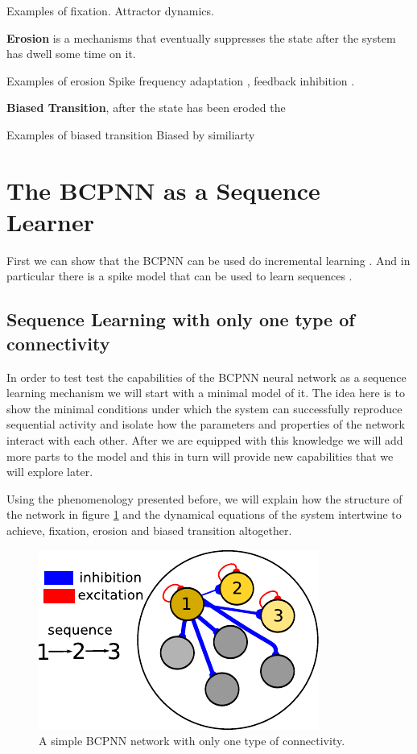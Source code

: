 \documentclass[10pt,a4paper]{article}
\begin{document}
Examples of fixation. Attractor dynamics.

\textbf{Erosion} is a mechanisms that eventually suppresses the state after the system has dwell some time on it. 

Examples of erosion 
Spike frequency adaptation \cite{roach2016memory}, feedback inhibition \cite{recanatesi2017memory}. 

\textbf{Biased Transition}, after the state has been eroded the 

Examples of biased transition
Biased by similiarty \cite{recanatesi2017memory}


\section{The BCPNN as a Sequence Learner}
First we can show that the BCPNN can be used do incremental learning \cite{sandberg2002bayesian}. And in particular there is a spike model that can be used to learn sequences \cite{tully2016spike}. 

\subsection{Sequence Learning with only one type of connectivity}
In order to test test the capabilities of the BCPNN neural network as a sequence learning mechanism we will start with a minimal model of it. The idea here is to show the minimal conditions under which the system can successfully reproduce sequential activity and isolate how the parameters and properties of the network interact with each other. After we are equipped with this knowledge we will add more parts to the model and this in turn will provide new capabilities that we will explore later. 

Using the phenomenology presented before, we will explain how the structure of the network in figure \ref{fig:bcpnn_simple_network} and the dynamical equations of the system intertwine to achieve, fixation, erosion and biased transition altogether. 

\begin{figure}[H]
\centering
\includegraphics[scale=1.40]{simple_BCPNN.pdf}
\caption{A simple BCPNN network with only one type of connectivity.}
\label{fig:bcpnn_simple_network}
\end{figure}
\end{document}
